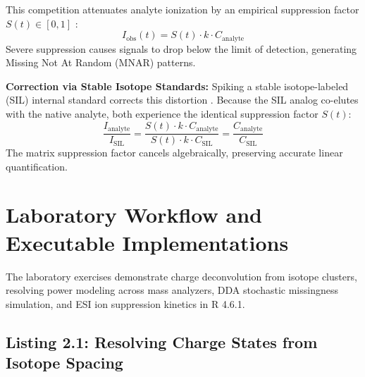 \documentclass[11pt,twoside,openright]{book}
\begin{document}
This competition attenuates analyte ionization by an empirical suppression factor $S(t) \in [0, 1]$ \cite{matuszewski2003strategies, annesley2003ion}:
\begin{equation}
I_{\text{obs}}(t) = S(t) \cdot k \cdot C_{\text{analyte}}
\end{equation}
Severe suppression causes signals to drop below the limit of detection, generating Missing Not At Random (MNAR) patterns.

\noindent\textbf{Correction via Stable Isotope Standards:}\enspace
Spiking a stable isotope-labeled (SIL) internal standard corrects this distortion \cite{ong2002stable}. Because the SIL analog co-elutes with the native analyte, both experience the identical suppression factor $S(t)$:
\begin{equation}
\frac{I_{\text{analyte}}}{I_{\text{SIL}}} = \frac{S(t) \cdot k \cdot C_{\text{analyte}}}{S(t) \cdot k \cdot C_{\text{SIL}}} = \frac{C_{\text{analyte}}}{C_{\text{SIL}}}
\end{equation}
The matrix suppression factor cancels algebraically, preserving accurate linear quantification.

\section{Laboratory Workflow and Executable Implementations}
\label{sec:lab_implementation}

The laboratory exercises demonstrate charge deconvolution from isotope clusters, resolving power modeling across mass analyzers, DDA stochastic missingness simulation, and ESI ion suppression kinetics in R 4.6.1.

\subsection{Listing 2.1: Resolving Charge States from Isotope Spacing}
\end{document}
